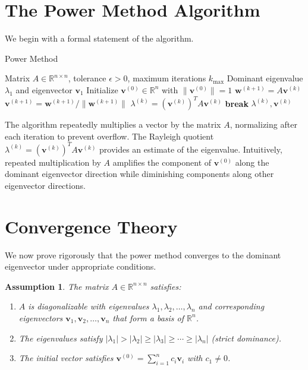 \documentclass[11pt,a4paper]{article}
\newtheorem{assumption}{Assumption}
\begin{document}
\section{The Power Method Algorithm}

We begin with a formal statement of the algorithm.

\begin{algorithm}
\caption{Power Method}
\begin{algorithmic}[1]
\Require Matrix $A \in \mathbb{R}^{n \times n}$, tolerance $\epsilon > 0$, maximum iterations $k_{\max}$
\Ensure Dominant eigenvalue $\lambda_1$ and eigenvector $\mathbf{v}_1$
\State Initialize $\mathbf{v}^{(0)} \in \mathbb{R}^n$ with $\|\mathbf{v}^{(0)}\| = 1$
    \State $\mathbf{w}^{(k+1)} = A\mathbf{v}^{(k)}$ 
    \State $\mathbf{v}^{(k+1)} = \mathbf{w}^{(k+1)} / \|\mathbf{w}^{(k+1)}\|$ 
    \State $\lambda^{(k)} = (\mathbf{v}^{(k)})^T A \mathbf{v}^{(k)}$ 
        \State \textbf{break}
    \EndIf
\EndFor
\State \Return $\lambda^{(k)}, \mathbf{v}^{(k)}$
\end{algorithmic}
\end{algorithm}

The algorithm repeatedly multiplies a vector by the matrix $A$, normalizing after each iteration to prevent overflow. The Rayleigh quotient $\lambda^{(k)} = (\mathbf{v}^{(k)})^T A \mathbf{v}^{(k)}$ provides an estimate of the eigenvalue. Intuitively, repeated multiplication by $A$ amplifies the component of $\mathbf{v}^{(0)}$ along the dominant eigenvector direction while diminishing components along other eigenvector directions.

\section{Convergence Theory}

We now prove rigorously that the power method converges to the dominant eigenvector under appropriate conditions.

\begin{assumption}\label{ass:main}
The matrix $A \in \mathbb{R}^{n \times n}$ satisfies:
\begin{enumerate}
    \item $A$ is diagonalizable with eigenvalues $\lambda_1, \lambda_2, \ldots, \lambda_n$ and corresponding eigenvectors $\mathbf{v}_1, \mathbf{v}_2, \ldots, \mathbf{v}_n$ that form a basis of $\mathbb{R}^n$.
    \item The eigenvalues satisfy $|\lambda_1| > |\lambda_2| \geq |\lambda_3| \geq \cdots \geq |\lambda_n|$ (strict dominance).
    \item The initial vector satisfies $\mathbf{v}^{(0)} = \sum_{i=1}^n c_i \mathbf{v}_i$ with $c_1 \neq 0$.
\end{enumerate}
\end{assumption}
\end{document}
